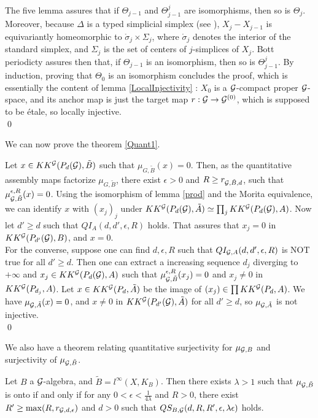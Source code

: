\begin{dem}
The five lemma assures that if $\Theta_{j-1}$ and $\Theta^j_{j-1}$ are isomorphisms, then so is $\Theta_j$. Moreover, because $\Delta$ is a typed simplicial simplex (see \cite{TuBC2}), $X_j-X_{j-1}$ is equivariantly homeomorphic to $\mathring \sigma_j \times \Sigma_j$, where  $\mathring \sigma _ j $ denotes the interior of the standard simplex, and   $\Sigma_j$ is the set of centers of $j$-simplices of $X_j$. Bott periodicty assures then that, if $\Theta_{j-1}$ is an isomorphism, then so is $\Theta^j_{j-1}$. By induction, proving that $\Theta_0$ is an isomorphism concludes the proof, which is essentially the content of lemma \ref{LocalInjectivity} : $X_0$ is a $\mathcal G$-compact proper $\mathcal G$-space, and its anchor map is just the target map $r:\mathcal G\rightarrow \mathcal G^{(0)}$, which is supposed to be étale, so locally injective.\\
\qed
\end{dem}

We can now prove the theorem \ref{Quant1}.\\

\begin{dem}
Let $x\in KK^\mathcal G(P_d(\mathcal G),\tilde B)$ such that $\mu_{G,\tilde B}(x)=0$. Then, as the quantitative assembly maps factorize $\mu_{G,\tilde B}$, there exist $\epsilon>0$ and $R\geq r_{\mathcal G,\tilde B,d}$, such that $\mu_{\mathcal G,\tilde B}^{\epsilon,R}(x)=0$. Using the isomorphism of lemma \ref{prod} and the Morita equivalence, we can identify $x$ with $(x_j)_j$ under $KK^\mathcal G(P_d(\mathcal G),\tilde A)\simeq\prod_j KK^\mathcal G(P_d(\mathcal G),A)$. Now let $d'\geq d$ such that $QI_{A}(d,d',\epsilon,R)$ holds. That assures that $x_j=0$ in $KK^\mathcal G(P_{d'}(\mathcal G),B)$, and $x=0$.\\

For the converse, suppose one can find $d,\epsilon,R$ such that $QI_{\mathcal G,A}(d,d',\epsilon,R)$ is NOT true for all $d'\geq d$. Then one can extract a increasing sequence $d_j$ diverging to $+\infty$ and $x_j\in KK^\mathcal G(P_d(\mathcal G),A)$ such that $\mu_{\mathcal G,\tilde B}^{\epsilon,R}(x_j)=0$ and $x_j\neq 0$ in $KK^\mathcal G(P_{d_j},A)$. Let $x\in KK^\mathcal G(P_d,\tilde A)$ be the image of $(x_j)\in \prod KK^\mathcal G(P_d,A)$. We have $\mu_{\mathcal G,\tilde A}(x)=0$, and $x\neq 0$ in $KK^\mathcal G(P_{d'}(\mathcal G),\tilde A)$ for all $d'\geq d$, so $\mu_{\mathcal G,\tilde A}$ is not injective. \\
\qed   
\end{dem}

We also have a theorem relating quantitative surjectivity for $\mu_{\mathcal G,B}$ and surjectivity of $\mu_{\mathcal G,\tilde B}$.

\begin{thm}
Let $B$ a $\mathcal G$-algebra, and $\tilde B = l^\infty(X,K_B)$. Then there exists $\lambda>1$ such that $\mu_{\mathcal G,\tilde B}$ is onto if and only if for any $0<\epsilon<\frac{1}{4\lambda}$ and $R>0$, there exist $R'\geq \max(R,r_{\mathcal G,d,\epsilon})$ and $d>0$ such that $QS_{B,\mathcal G}(d,R,R',\epsilon,\lambda\epsilon)$ holds.
\end{thm}

